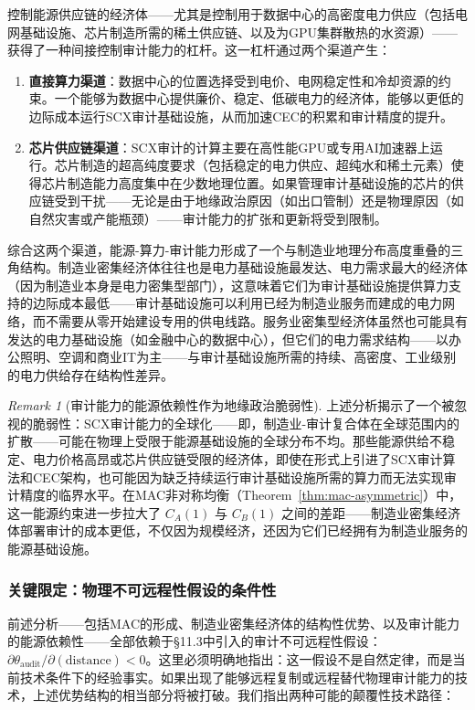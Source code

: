 \documentclass[12pt,a4paper]{ctexart}
\theoremstyle{definition}
\theoremstyle{remark}
\newtheorem{remark}{Remark}[section]
\begin{document}
控制能源供应链的经济体——尤其是控制用于数据中心的高密度电力供应（包括电网基础设施、芯片制造所需的稀土供应链、以及为GPU集群散热的水资源）——获得了一种间接控制审计能力的杠杆。这一杠杆通过两个渠道产生：

\begin{enumerate}[label=(\roman*)]
    \item \textbf{直接算力渠道}：数据中心的位置选择受到电价、电网稳定性和冷却资源的约束。一个能够为数据中心提供廉价、稳定、低碳电力的经济体，能够以更低的边际成本运行SCX审计基础设施，从而加速CEC的积累和审计精度的提升。
    \item \textbf{芯片供应链渠道}：SCX审计的计算主要在高性能GPU或专用AI加速器上运行。芯片制造的超高纯度要求（包括稳定的电力供应、超纯水和稀土元素）使得芯片制造能力高度集中在少数地理位置。如果管理审计基础设施的芯片的供应链受到干扰——无论是由于地缘政治原因（如出口管制）还是物理原因（如自然灾害或产能瓶颈）——审计能力的扩张和更新将受到限制。
\end{enumerate}

综合这两个渠道，能源-算力-审计能力形成了一个与制造业地理分布高度重叠的三角结构。制造业密集经济体往往也是电力基础设施最发达、电力需求最大的经济体（因为制造业本身是电力密集型部门），这意味着它们为审计基础设施提供算力支持的边际成本最低——审计基础设施可以利用已经为制造业服务而建成的电力网络，而不需要从零开始建设专用的供电线路。服务业密集型经济体虽然也可能具有发达的电力基础设施（如金融中心的数据中心），但它们的电力需求结构——以办公照明、空调和商业IT为主——与审计基础设施所需的持续、高密度、工业级别的电力供给存在结构性差异。

\begin{remark}[审计能力的能源依赖性作为地缘政治脆弱性]
上述分析揭示了一个被忽视的脆弱性：SCX审计能力的全球化——即，制造业-审计复合体在全球范围内的扩散——可能在物理上受限于能源基础设施的全球分布不均。那些能源供给不稳定、电力价格高昂或芯片供应链受限的经济体，即使在形式上引进了SCX审计算法和CEC架构，也可能因为缺乏持续运行审计基础设施所需的算力而无法实现审计精度的临界水平。在MAC非对称均衡（Theorem~\ref{thm:mac-asymmetric}）中，这一能源约束进一步拉大了 $C_A(1)$ 与 $C_B(1)$ 之间的差距——制造业密集经济体部署审计的成本更低，不仅因为规模经济，还因为它们已经拥有为制造业服务的能源基础设施。
\end{remark}

\subsubsection*{关键限定：物理不可远程性假设的条件性}

前述分析——包括MAC的形成、制造业密集经济体的结构性优势、以及审计能力的能源依赖性——全部依赖于§11.3中引入的审计不可远程性假设：$\partial \theta_{\text{audit}} / \partial (\text{distance}) < 0$。这里必须明确地指出：这一假设不是自然定律，而是当前技术条件下的经验事实。如果出现了能够远程复制或远程替代物理审计能力的技术，上述优势结构的相当部分将被打破。我们指出两种可能的颠覆性技术路径：
\end{document}
